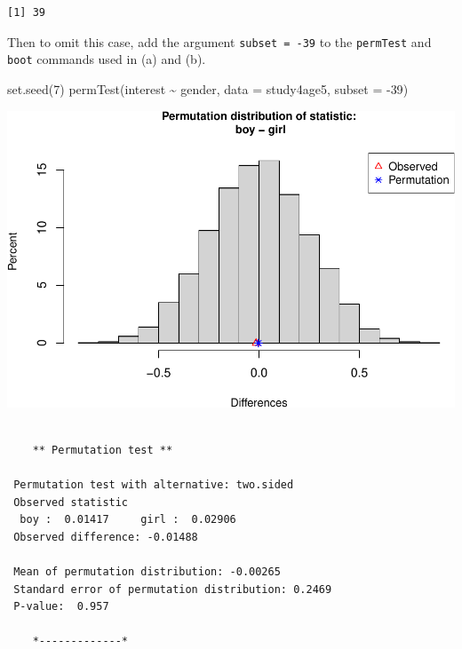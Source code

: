\documentclass[
]{book}
\newenvironment{Shaded}{\begin{snugshade}}{\end{snugshade}}
\newcommand{\AttributeTok}[1]{\textcolor[rgb]{0.77,0.63,0.00}{#1}}
\newcommand{\DecValTok}[1]{\textcolor[rgb]{0.00,0.00,0.81}{#1}}
\newcommand{\FunctionTok}[1]{\textcolor[rgb]{0.00,0.00,0.00}{#1}}
\newcommand{\NormalTok}[1]{#1}
\newcommand{\SpecialCharTok}[1]{\textcolor[rgb]{0.00,0.00,0.00}{#1}}
\begin{document}
\begin{Shaded}
\end{Shaded}

\begin{verbatim}
[1] 39
\end{verbatim}

Then to omit this case, add the argument \texttt{subset\ =\ -39} to the \texttt{permTest} and \texttt{boot} commands used in (a) and (b).

\begin{Shaded}
\begin{Highlighting}[]
\FunctionTok{set.seed}\NormalTok{(}\DecValTok{7}\NormalTok{)}
\FunctionTok{permTest}\NormalTok{(interest }\SpecialCharTok{\textasciitilde{}}\NormalTok{ gender, }\AttributeTok{data =}\NormalTok{ study4age5, }\AttributeTok{subset =} \SpecialCharTok{{-}}\DecValTok{39}\NormalTok{)}
\end{Highlighting}
\end{Shaded}

\includegraphics[width=1\linewidth]{Class_Activity_14_files/figure-latex/unnamed-chunk-13-1}

\begin{verbatim}

    ** Permutation test **

 Permutation test with alternative: two.sided 
 Observed statistic
  boy :  0.01417     girl :  0.02906 
 Observed difference: -0.01488 

 Mean of permutation distribution: -0.00265 
 Standard error of permutation distribution: 0.2469 
 P-value:  0.957 

    *-------------*
\end{verbatim}
\end{document}
